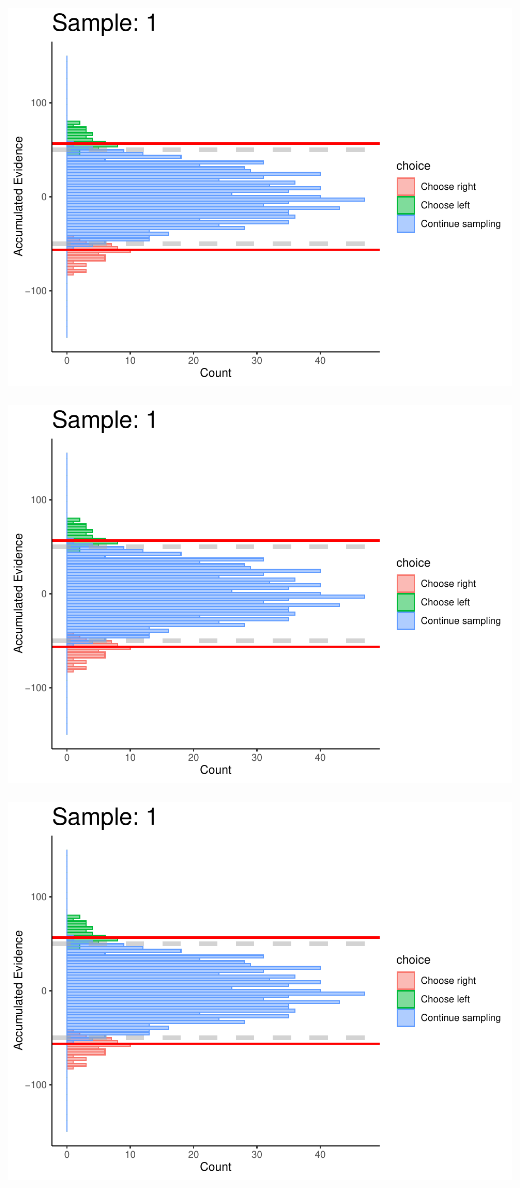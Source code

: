 \documentclass[
]{book}
\begin{document}
\begin{center}\includegraphics[width=0.8\linewidth]{LateNightBayes_files/figure-latex/fixed_dcb-1} \end{center}

\begin{center}\includegraphics[width=0.8\linewidth]{LateNightBayes_files/figure-latex/fixed_dcb-2} \end{center}

\begin{center}\includegraphics[width=0.8\linewidth]{LateNightBayes_files/figure-latex/fixed_dcb-3} \end{center}
\end{document}
